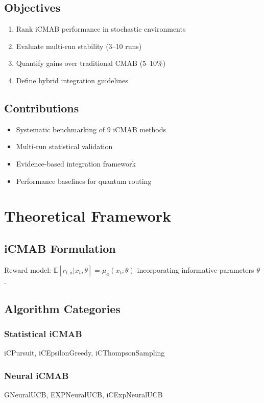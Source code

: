 \documentclass[12pt,a4paper]{article}
\begin{document}
\subsection{Objectives}
\begin{enumerate}
\item Rank iCMAB performance in stochastic environments
\item Evaluate multi-run stability (3–10 runs)
\item Quantify gains over traditional CMAB (5–10\%)
\item Define hybrid integration guidelines
\end{enumerate}

\subsection{Contributions}
\begin{itemize}
\item Systematic benchmarking of 9 iCMAB methods
\item Multi-run statistical validation
\item Evidence-based integration framework
\item Performance baselines for quantum routing
\end{itemize}

\section{Theoretical Framework}
\subsection{iCMAB Formulation}
Reward model: $\mathbb{E}[r_{t,a}|x_t,\theta]=\mu_a(x_t;\theta)$ incorporating informative parameters $\theta$.

\subsection{Algorithm Categories}
\subsubsection{Statistical iCMAB}
iCPursuit, iCEpsilonGreedy, iCThompsonSampling

\subsubsection{Neural iCMAB}
GNeuralUCB, EXPNeuralUCB, iCExpNeuralUCB
\end{document}
